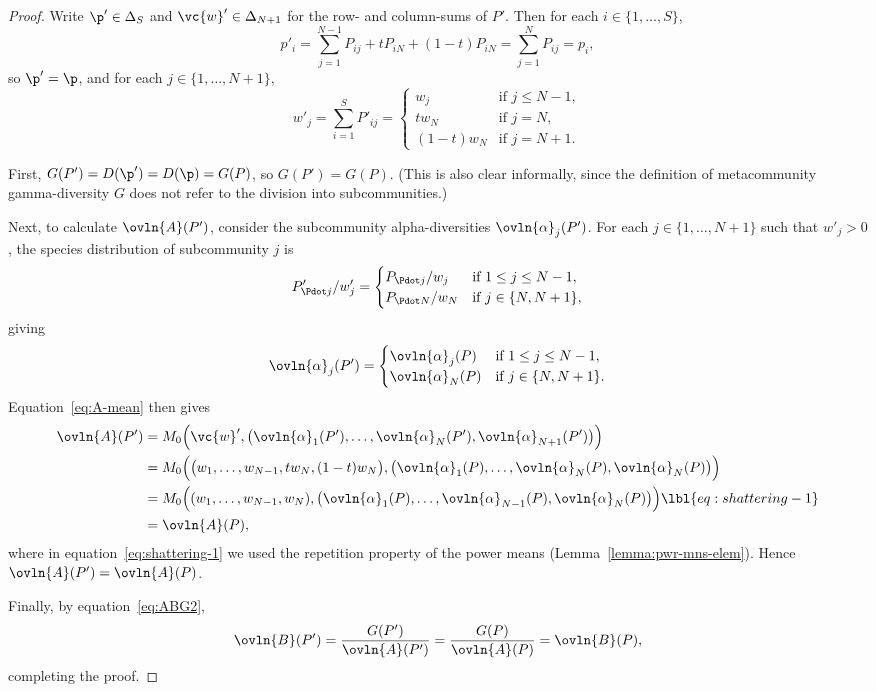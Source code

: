 \begin{proof}
Write $\p' \in \Delta_S$ and $\vc{w}' \in
\Delta_{N + 1}$ for the row- and column-sums of $P'$.  Then for each $i \in
\{1, \ldots, S\}$, 
\[
p'_i 
=
\sum_{j = 1}^{N - 1} P_{ij} + tP_{iN} + (1 - t)P_{iN} 
=
\sum_{j = 1}^N P_{ij} 
=
p_i,
\]
so $\p' = \p$, and for each $j \in \{1, \ldots, N + 1\}$, 
\[
w'_j 
=
\sum_{i = 1}^S P'_{ij}
=
\begin{cases}
w_j             &\text{if } j \leq N - 1,       \\
tw_N            &\text{if } j = N,              \\
(1 - t)w_N      &\text{if } j = N + 1.
\end{cases}
\]

First, $G(P') = D(\p') = D(\p) = G(P)$, so $G(P') = G(P)$.  (This is also
clear informally, since the definition of metacommunity gamma-diversity $G$
does not refer to the division into subcommunities.)

Next, to calculate $\ovln{A}(P')$, consider the subcommunity
alpha-diversities $\ovln{\alpha}_j(P')$.  For each $j \in \{1, \ldots, N + 1\}$
such that $w'_j > 0$, the species distribution of subcommunity $j$ is
\[
P'_{\Pdot j}/w'_j
=
\begin{cases}
P_{\Pdot j}/w_j &\text{if } 1 \leq j \leq N - 1,        \\
P_{\Pdot N}/w_N &\text{if } j \in \{N, N + 1\},
\end{cases}
\]
giving
\[
\ovln{\alpha}_j(P')
=
\begin{cases}
\ovln{\alpha}_j(P)      &\text{if } 1 \leq j \leq N - 1,        \\
\ovln{\alpha}_N(P)      &\text{if } j \in \{N, N + 1\}.
\end{cases}
\]
Equation~\eqref{eq:A-mean} then gives
% 
\begin{align}
\ovln{A}(P')    &
=
M_0\Bigl( \vc{w}', 
\bigl( 
\ovln{\alpha}_1(P'), \ldots, \ovln{\alpha}_N(P'), 
\ovln{\alpha}_{N + 1}(P')
\bigr)
\Bigr)  
\nonumber       \\
&
=
M_0\Bigl( 
\bigl( w_1, \ldots, w_{N - 1}, tw_N, (1 - t)w_N \bigr), 
\bigl( 
\ovln{\alpha}_1(P), \ldots, \ovln{\alpha}_N(P), \ovln{\alpha}_N(P)
\bigr)
\Bigr)  
\nonumber       \\
&
=
M_0\Bigl(
( w_1, \ldots, w_{N - 1}, w_N ),
\bigl( \ovln{\alpha}_1(P), \ldots, \ovln{\alpha}_{N - 1}(P), 
\ovln{\alpha}_N(P) \bigr)
\Bigr)
\lbl{eq:shattering-1} \\
&
=
\ovln{A}(P),
\nonumber
\end{align}
% 
where in equation~\eqref{eq:shattering-1} we used the repetition property
of the power means (Lemma~\ref{lemma:pwr-mns-elem}). Hence $\ovln{A}(P') =
\ovln{A}(P)$. 

Finally, by equation~\eqref{eq:ABG2},
\[
\ovln{B}(P')
=
\frac{G(P')}{\ovln{A}(P')}
=
\frac{G(P)}{\ovln{A}(P)}
=
\ovln{B}(P),
\]
completing the proof.
\end{proof}

